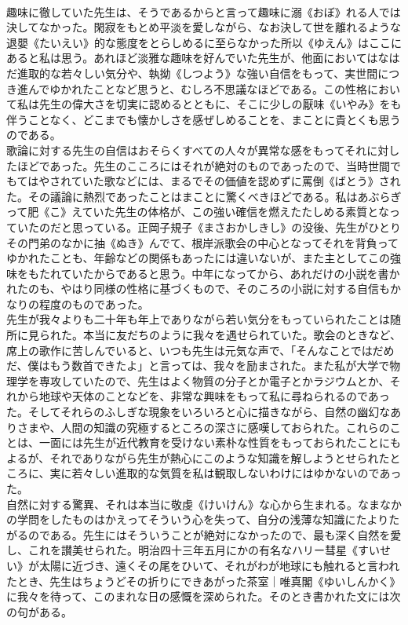 \documentclass[8pt]{extreport}
\begin{document}
\begin{CJK}{UTF8}{min}
\\	趣味に徹していた先生は、そうであるからと言って趣味に溺《おぼ》れる人では決してなかった。閑寂をもとめ平淡を愛しながら、なお決して世を離れるような退嬰《たいえい》的な態度をとらしめるに至らなかった所以《ゆえん》はここにあると私は思う。あれほど淡雅な趣味を好んでいた先生が、他面においてはなはだ進取的な若々しい気分や、執拗《しつよう》な強い自信をもって、実世間につき進んでゆかれたことなど思うと、むしろ不思議なほどである。この性格において私は先生の偉大さを切実に認めるとともに、そこに少しの厭味《いやみ》をも伴うことなく、どこまでも懐かしさを感ぜしめることを、まことに貴とくも思うのである。
\\	歌論に対する先生の自信はおそらくすべての人々が異常な感をもってそれに対したほどであった。先生のこころにはそれが絶対のものであったので、当時世間でもてはやされていた歌などには、まるでその価値を認めずに罵倒《ばとう》された。その議論に熱烈であったことはまことに驚くべきほどである。私はあぶらぎって肥《こ》えていた先生の体格が、この強い確信を燃えたたしめる素質となっていたのだと思っている。正岡子規子《まさおかしきし》の没後、先生がひとりその門弟のなかに抽《ぬき》んでて、根岸派歌会の中心となってそれを背負ってゆかれたことも、年齢などの関係もあったには違いないが、また主としてこの強味をもたれていたからであると思う。中年になってから、あれだけの小説を書かれたのも、やはり同様の性格に基づくもので、そのころの小説に対する自信もかなりの程度のものであった。
\\	先生が我々よりも二十年も年上でありながら若い気分をもっていられたことは随所に見られた。本当に友だちのように我々を遇せられていた。歌会のときなど、席上の歌作に苦しんでいると、いつも先生は元気な声で、「そんなことではだめだ、僕はもう数首できたよ」と言っては、我々を励まされた。また私が大学で物理学を専攻していたので、先生はよく物質の分子とか電子とかラジウムとか、それから地球や天体のことなどを、非常な興味をもって私に尋ねられるのであった。そしてそれらのふしぎな現象をいろいろと心に描きながら、自然の幽幻なありさまや、人間の知識の究極するところの深さに感嘆しておられた。これらのことは、一面には先生が近代教育を受けない素朴な性質をもっておられたことにもよるが、それでありながら先生が熱心にこのような知識を解しようとせられたところに、実に若々しい進取的な気質を私は観取しないわけにはゆかないのであった。
\\	自然に対する驚異、それは本当に敬虔《けいけん》な心から生まれる。なまなかの学問をしたものはかえってそういう心を失って、自分の浅薄な知識にたよりたがるのである。先生にはそういうことが絶対になかったので、最も深く自然を愛し、これを讃美せられた。明治四十三年五月にかの有名なハリー彗星《すいせい》が太陽に近づき、遠くその尾をひいて、それがわが地球にも触れると言われたとき、先生はちょうどその折りにできあがった茶室｜唯真閣《ゆいしんかく》に我々を待って、このまれな日の感慨を深められた。そのとき書かれた文には次の句がある。

\end{CJK}
\end{document}
